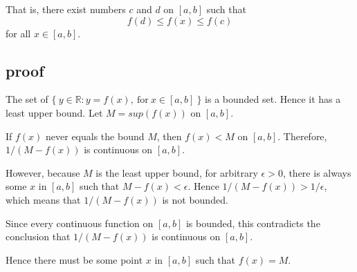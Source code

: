 \documentclass[11pt, oneside]{article}
\begin{document}
That is, there exist numbers $c$ and $d$ on $[a,b]$ such that
\[ f(d) \le f(x) \le f(c) \]
for all $x \in [a,b]$.

\subsection*{proof}

The set of $\{ \ y \in \mathbb{R}: y = f(x), \ \text{for} \ x \in [a,b] \ \}$ is a bounded set.  Hence it has a least upper bound.  Let $M = sup(f(x))$ on $[a,b]$.  

If $f(x)$ never equals the bound $M$, then $f(x) < M$ on $[a,b]$.  Therefore, $1/(M - f(x))$ is continuous on $[a,b]$.

However, because $M$ is the least upper bound, for arbitrary $\epsilon > 0$, there is always some $x$ in $[a,b]$ such that $M - f(x) < \epsilon$.  Hence $1/(M - f(x)) > 1/\epsilon$, which means that $1/(M - f(x))$ is not bounded.

Since every continuous function on $[a,b]$ is bounded, this contradicts the conclusion that $1/(M - f(x))$ is continuous on $[a,b]$.

Hence there must be some point $x$ in $[a,b]$ such that $f(x) = M$.
\end{document}
